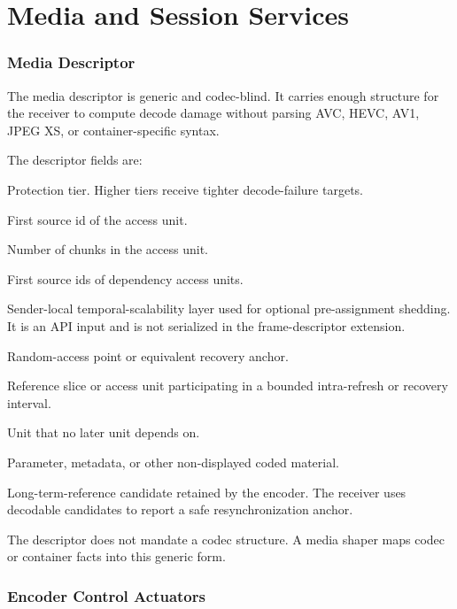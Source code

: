 \documentclass[11pt]{article}
\newcommand{\code}[1]{\ifmmode\text{\texttt{#1}}\else\texttt{#1}\fi}
\newcommand{\field}[1]{\code{#1}}
\begin{document}
\clearpage
\part{Media and Session Services}

\section{Media Descriptor}

The media descriptor is generic and codec-blind. It carries enough structure for
the receiver to compute decode damage without parsing AVC, HEVC, AV1, JPEG XS, or
container-specific syntax.

The descriptor fields are:

\begin{description}[leftmargin=3.0cm,style=nextline]
\item[\field{Priority}]
  Protection tier. Higher tiers receive tighter decode-failure targets.
\item[\field{FrameStart}]
  First source id of the access unit.
\item[\field{FrameLen}]
  Number of chunks in the access unit.
\item[\field{RefStart[]}]
  First source ids of dependency access units.
\item[\field{TemporalID}]
  Sender-local temporal-scalability layer used for optional pre-assignment
  shedding. It is an API input and is not serialized in the frame-descriptor
  extension.
\item[RAP]
  Random-access point or equivalent recovery anchor.
\item[Recovery-refresh]
  Reference slice or access unit participating in a bounded intra-refresh or
  recovery interval.
\item[Discardable]
  Unit that no later unit depends on.
\item[Non-picture]
  Parameter, metadata, or other non-displayed coded material.
\item[LTR]
  Long-term-reference candidate retained by the encoder. The receiver uses
  decodable candidates to report a safe resynchronization anchor.
\end{description}

The descriptor does not mandate a codec structure. A media shaper maps codec or
container facts into this generic form.

\section{Encoder Control Actuators}
\end{document}
